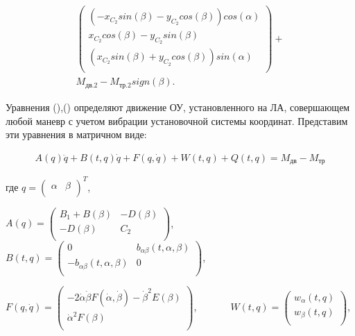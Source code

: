 \begin{equation}
\begin{multlined}
\left( \begin{array}{c}
	\left( -x_{C_{2}}sin \left( \beta \right) -y_{C_{2}}cos \left( \beta \right) \right) cos \left( \alpha \right) \\
	x_{C_{2}}cos \left( \beta \right) -y_{C_{2}}sin \left( \beta \right) \\
	\left( x_{C_{2}}sin \left( \beta \right) +y_{C_{2}}cos \left( \beta \right) \right) sin \left( \alpha \right) \\
\end{array}
\right) +\\
M_{\textit{дв.2}}-M_{\textit{тр.2}}sign \left( \beta \right) .
\end{multlined}
\end{equation}

Уравнения (),() определяют движение ОУ, установленного на ЛА, совершающем любой маневр с учетом вибрации установочной системы координат. Представим эти уравнения в матричном виде:

\begin{equation}%
\label{eq:p3:48}
\begin{multlined}
A \left( q \right) \ddot q+B \left( t,q \right) \dot q+F \left( q,\dot q \right) +W \left( t,q \right) +Q \left( t,q \right) =M_{\textit{дв}}-M_{\textit{тр}}
\end{multlined}
\end{equation}

где \( q= \left( 
\begin{matrix}
\alpha & \beta \\
\end{matrix}
\right)^{T} 
\), 

\( A \left( q \right) = \left( \begin{matrix}
B_{1}+B \left( \beta \right) & -D \left( \beta \right) \\
-D \left( \beta \right) & C_{2}\\
\end{matrix}
\right) \),\ \ \ \ \( B \left( t,q \right) = \left( \begin{matrix}
0 & b_{ \alpha \beta } \left( t, \alpha, \beta \right) \\
-b_{ \alpha \beta } \left( t, \alpha, \beta \right) & 0\\
\end{matrix}
\right) \), 

\( F \left( q,\dot q \right) = \left( \begin{matrix}
-2 \dot \alpha \dot \beta F \left( \dot \alpha, \dot \beta \right) - {\dot \beta}^{2}E \left( \beta \right) \\
\dot \alpha ^{2}F \left( \beta \right) \\
\end{matrix}
\right) \),\ \ \ \ \ \ \ \( W \left( t,q \right) = \left( \begin{matrix}
w_{ \alpha } \left( t,q \right) \\
w_{ \beta } \left( t,q \right) \\
\end{matrix}
\right) \), 

